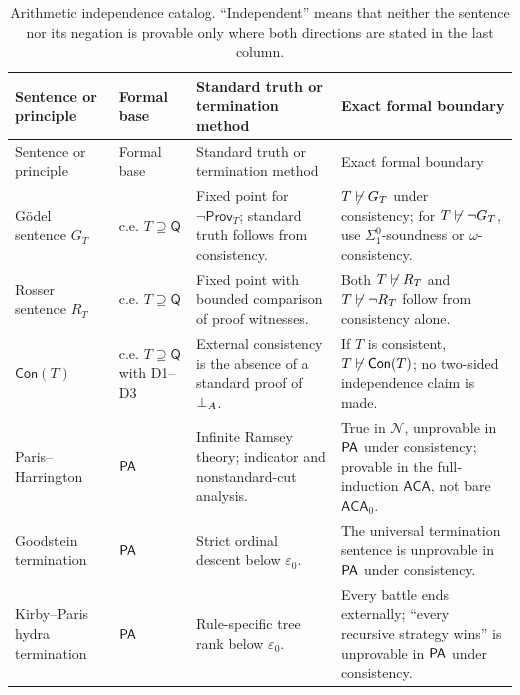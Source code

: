 \begingroup\small
\begin{longtable}{@{}p{}p{}p{}p{}@{}}
\caption{Arithmetic independence catalog.  “Independent”
means that neither the sentence nor its negation is provable only where both
directions are stated in the last column.}
\label{tab:p05-independence-catalog}\\
\toprule
Sentence or principle & Formal base & Standard truth or termination method &
Exact formal boundary \\
\midrule
\endfirsthead
\toprule
Sentence or principle & Formal base & Standard truth or termination method &
Exact formal boundary \\
\midrule
\endhead
G\"odel sentence \(G_T\) & c.e. \(T\supseteq\mathsf Q\) &
Fixed point for \(\neg\mathsf{Prov}_T\); standard truth follows from
consistency. &
\(T\not\vdash G_T\) under consistency; for
\(T\not\vdash\neg G_T\), use \(\Sigma^0_1\)-soundness or
\(\omega\)-consistency. \\
\addlinespace
Rosser sentence \(R_T\) & c.e. \(T\supseteq\mathsf Q\) &
Fixed point with bounded comparison of proof witnesses. &
Both \(T\not\vdash R_T\) and \(T\not\vdash\neg R_T\) follow from
consistency alone. \\
\addlinespace
\(\mathsf{Con}(T)\) & c.e. \(T\supseteq\mathsf Q\) with D1--D3 &
External consistency is the absence of a standard proof of
\(\bot_A\). &
If \(T\) is consistent, \(T\not\vdash\mathsf{Con}(T)\); no two-sided
independence claim is made. \\
\addlinespace
Paris--Harrington & \(\mathsf{PA}\) &
Infinite Ramsey theory; indicator and nonstandard-cut analysis. &
True in \(\mathcal N\), unprovable in \(\mathsf{PA}\) under consistency; provable in
the full-induction \(\mathsf{ACA}\), not bare \(\mathsf{ACA}_0\). \\
\addlinespace
Goodstein termination & \(\mathsf{PA}\) &
Strict ordinal descent below \(\varepsilon_0\). &
The universal termination sentence is unprovable in \(\mathsf{PA}\) under
consistency. \\
\addlinespace
Kirby--Paris hydra termination & \(\mathsf{PA}\) &
Rule-specific tree rank below \(\varepsilon_0\). &
Every battle ends externally; “every recursive strategy wins” is unprovable
in \(\mathsf{PA}\) under consistency. \\
\bottomrule
\end{longtable}
\endgroup
